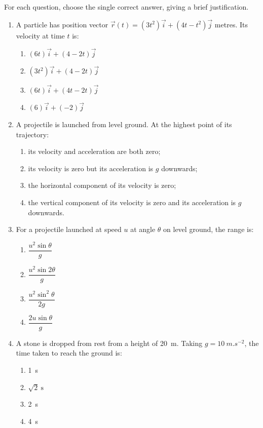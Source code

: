 \documentclass[11pt]{article}
\begin{document}
\begin{exercice}
For each question, choose the single correct answer, giving a brief justification.
\begin{enumerate}
\item A particle has position vector $\vec{r}(t) = (3t^2)\vec{i} + (4t - t^2)\vec{j}$ metres. Its velocity at time $t$ is:
\begin{enumerate}
\item $(6t)\vec{i} + (4 - 2t)\vec{j}$
\item $(3t^2)\vec{i} + (4 - 2t)\vec{j}$
\item $(6t)\vec{i} + (4t - 2t)\vec{j}$
\item $(6)\vec{i} + (-2)\vec{j}$
\end{enumerate}
\item A projectile is launched from level ground. At the highest point of its trajectory:
\begin{enumerate}
\item its velocity and acceleration are both zero;
\item its velocity is zero but its acceleration is $g$ downwards;
\item the horizontal component of its velocity is zero;
\item the vertical component of its velocity is zero and its acceleration is $g$ downwards.
\end{enumerate}
\item For a projectile launched at speed $u$ at angle $\theta$ on level ground, the range is:
\begin{enumerate}
\item $\dfrac{u^2\sin\theta}{g}$
\item $\dfrac{u^2\sin 2\theta}{g}$
\item $\dfrac{u^2\sin^2\theta}{2g}$
\item $\dfrac{2u\sin\theta}{g}$
\end{enumerate}
\item A stone is dropped from rest from a height of \SI{20}{m}. Taking $g = \SI{10}{m.s^{-2}}$, the time taken to reach the ground is:
\begin{enumerate}
\item \SI{1}{s}
\item $\sqrt{2}\ \mathrm{s}$
\item \SI{2}{s}
\item \SI{4}{s}
\end{enumerate}
\end{enumerate}
\end{exercice}
\end{document}

